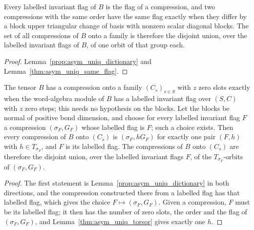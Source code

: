 \begin{theorem}
    \label{thm:asym_uniq_all}
    \leanok
    Every labelled invariant flag of $B$ is the flag of a compression, and two compressions with the
    same order have the same flag exactly when they differ by a block upper triangular change of
    basis with nonzero scalar diagonal blocks. The set of all compressions of $B$ onto a family is
    therefore the disjoint union, over the labelled invariant flags of $B$, of one orbit of that group each.
\end{theorem}

\begin{proof}
    \leanok
    Lemma~\ref{prop:asym_uniq_dictionary} and Lemma~\ref{thm:asym_uniq_same_flag}.
\end{proof}

\begin{theorem}
    \label{thm:asym_uniq_all_reductions}
    \leanok
    The tensor $B$ has a compression onto a family $(C_s)_{s\in S}$ with $z$ zero slots exactly when
    the word-algebra module of $B$ has a labelled invariant flag over $(S,C)$ with $z$ zero steps;
    this needs no hypothesis on the blocks. Let the blocks be normal of positive bond dimension,
    and choose for every labelled invariant flag $F$ a compression $(\sigma_F,G_F)$ whose labelled
    flag is $F$; such a choice exists. Then every compression of $B$ onto $(C_s)$ is
    $(\sigma_F,hG_F)$ for exactly one pair $(F,h)$ with $h\in T_{\sigma_F}$, and $F$ is its labelled
    flag. The compressions of $B$ onto $(C_s)$ are therefore the disjoint union, over the labelled
    invariant flags $F$, of the $T_{\sigma_F}$-orbits of $(\sigma_F,G_F)$.
\end{theorem}

\begin{proof}
    \leanok
    The first statement is Lemma~\ref{prop:asym_uniq_dictionary} in both directions, and the
    compression constructed there from a labelled flag has that labelled flag, which gives the
    choice $F\mapsto(\sigma_F,G_F)$. Given a compression, $F$ must be its labelled flag; it then has
    the number of zero slots, the order and the flag of $(\sigma_F,G_F)$, and
    Lemma~\ref{thm:asym_uniq_torsor} gives exactly one $h$.
\end{proof}

